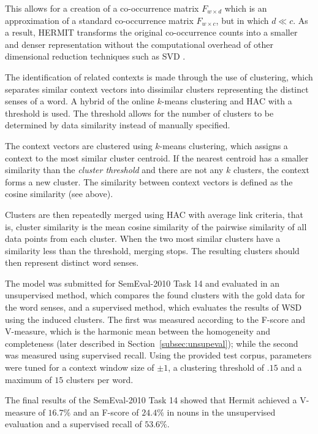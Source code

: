This allows for a creation of a co-occurrence matrix $F_{w \times d}$ which is
an approximation of a standard co-occurrence matrix $F_{w \times c}$, but in
which $d \ll c$. As a result, HERMIT transforms the original co-occurrence 
counts into a smaller and denser representation without the computational 
overhead of other dimensional reduction techniques such as \ac{SVD} 
\citep{jurgens2010hermit}.

The identification of related contexts is made through the use of clustering, 
which separates similar context vectors into dissimilar clusters representing 
the distinct senses of a word. A hybrid of the online $k$-means clustering 
\citep{liberty2016algorithm} and \ac{HAC} \citep{zepeda2013hierarchical} with a 
threshold is used. The threshold allows for the number of clusters to be 
determined by data similarity instead of manually specified.

The context vectors are clustered using $k$-means clustering, which assigns a 
context to the most similar cluster centroid. If the nearest centroid has a 
smaller similarity than the \textit{cluster threshold} and there are not any 
$k$ clusters, the context forms a new cluster. The similarity between context 
vectors is defined as the cosine similarity (see above).

Clusters are then repeatedly merged using \ac{HAC} with average link criteria,
that is, cluster similarity is the mean cosine similarity of the pairwise
similarity of all data points from each cluster. When the two most similar
clusters have a similarity less than the threshold, merging stops. The resulting
clusters should then represent distinct word senses.

The model was submitted for SemEval-2010 Task 14 \citep{manandhar2009semeval}
and evaluated in an unsupervised method, which compares the found clusters with 
the gold data for the word senses, and a supervised method, which evaluates the 
results of \ac{WSD} using the induced clusters. The first was measured
according to the F-score and V-measure, which is the harmonic mean between the 
homogeneity and completeness (later described in Section~\ref{subsec:unsupeval});
while the second was measured using supervised recall. Using the provided test 
corpus, parameters were tuned for a context window size of $\pm1$, a clustering
threshold of $.15$ and a maximum of $15$ clusters per word.

The final results of the SemEval-2010 Task 14 showed that Hermit achieved a
V-measure of $16.7\%$ and an F-score of $24.4\%$ in nouns in the unsupervised
evaluation and a supervised recall of $53.6\%$.


